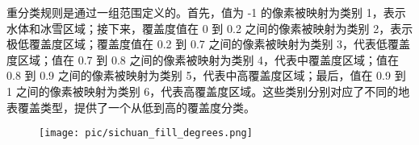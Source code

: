 \documentclass{article}
\begin{document}
		\par 重分类规则是通过一组范围定义的。首先，值为 -1 的像素被映射为类别 1，表示水体和冰雪区域；接下来，覆盖度值在 0 到 0.2 之间的像素被映射为类别 2，表示极低覆盖度区域；覆盖度值在 0.2 到 0.7 之间的像素被映射为类别 3，代表低覆盖度区域；值在 0.7 到 0.8 之间的像素被映射为类别 4，代表中覆盖度区域；值在 0.8 到 0.9 之间的像素被映射为类别 5，代表中高覆盖度区域；最后，值在 0.9 到 1 之间的像素被映射为类别 6，代表高覆盖度区域。这些类别分别对应了不同的地表覆盖类型，提供了一个从低到高的覆盖度分类。
		\begin{figure}[H]  %
			\centering
			\texttt{[image: pic/sichuan\_fill\_degrees.png]} %
		
				\end{figure}
		
\end{document}
